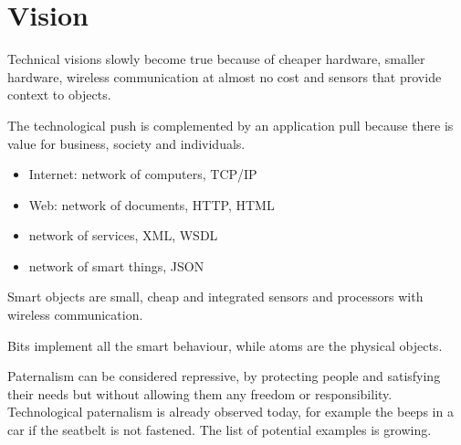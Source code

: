 \section{Vision}
\begin{myremark}Technical visions slowly become true because of cheaper hardware, smaller hardware, wireless communication at almost no cost and sensors that provide context to objects.
\end{myremark}
\begin{mytitle} The technological push is complemented by an application pull because there is value for business, society and individuals.
\end{mytitle}
\begin{mytitle}\hfill
\begin{itemize}
    \item Internet: network of computers, TCP/IP
    \item Web: network of documents, HTTP, HTML
    \item network of services, XML, WSDL
    \item network of smart things, JSON
\end{itemize}
\end{mytitle}
\begin{mytitle} Smart objects are small, cheap and integrated sensors and processors with wireless communication.
\end{mytitle}
\begin{mytitle} Bits implement all the smart behaviour, while atoms are the physical objects.
\end{mytitle}
\begin{mytitle} Paternalism can be considered repressive, by protecting people and satisfying their needs but without allowing them any freedom or responsibility. Technological paternalism is already observed today, for example the beeps in a car if the seatbelt is not fastened. The list of potential examples is growing.
\end{mytitle}
